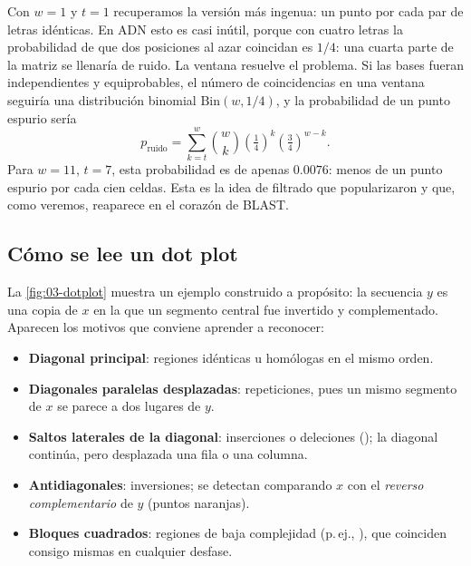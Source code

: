 \begin{simbolos}
\end{simbolos}

Con $w=1$ y $t=1$ recuperamos la versión más ingenua: un punto por cada par de letras idénticas. En ADN esto es casi inútil, porque con cuatro letras la probabilidad de que dos posiciones al azar coincidan es $1/4$: una cuarta parte de la matriz se llenaría de ruido. La ventana resuelve el problema. Si las bases fueran independientes y equiprobables, el número de coincidencias en una ventana seguiría una distribución binomial $\mathrm{Bin}(w, 1/4)$, y la probabilidad de un punto espurio sería
\begin{equation}\label{eq:03-ruido}
p_{\text{ruido}} = \sum_{k=t}^{w}\binom{w}{k}\left(\tfrac14\right)^k\left(\tfrac34\right)^{w-k}.
\end{equation}
Para $w=11$, $t=7$, esta probabilidad es de apenas $\num{0.0076}$: menos de un punto espurio por cada cien celdas. Esta es la idea de filtrado que \textcite{c03-maizel1981} popularizaron y que, como veremos, reaparece en el corazón de BLAST.

\subsection{Cómo se lee un dot plot}

La \cref{fig:03-dotplot} muestra un ejemplo construido a propósito: la secuencia $y$ es una copia de $x$ en la que un segmento central fue invertido y complementado. Aparecen los motivos que conviene aprender a reconocer:

\begin{itemize}
  \item \textbf{Diagonal principal}: regiones idénticas u homólogas en el mismo orden.
  \item \textbf{Diagonales paralelas desplazadas}: repeticiones, pues un mismo segmento de $x$ se parece a dos lugares de $y$.
  \item \textbf{Saltos laterales de la diagonal}: inserciones o deleciones (); la diagonal continúa, pero desplazada una fila o una columna.
  \item \textbf{Antidiagonales}: inversiones; se detectan comparando $x$ con el \emph{reverso complementario} de $y$ (puntos naranjas).
  \item \textbf{Bloques cuadrados}: regiones de baja complejidad (p.\,ej., ), que coinciden consigo mismas en cualquier desfase.
\end{itemize}

